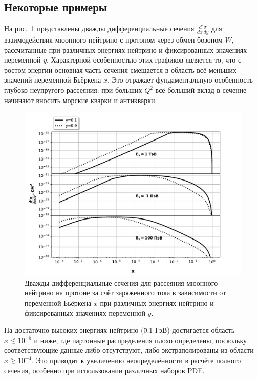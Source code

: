 \subsection{Некоторые примеры}

На рис.~\ref{fig:xsec_2d} представлены дважды дифференциальные сечения $\frac{d^2\sigma}{dx\,dy}$ для взаимодействия мюонного нейтрино с протоном через обмен бозоном $W$, рассчитанные при различных энергиях нейтрино и фиксированных значениях переменной $y$. Характерной особенностью этих графиков является то, что с ростом энергии основная часть сечения смещается в область всё меньших значений переменной Бьёркена $x$. Это отражает фундаментальную особенность глубоко-неупругого рассеяния: при больших $Q^2$ всё больший вклад в сечение начинают вносить морские кварки и антикварки.

\begin{figure}[!h]
\centering
\includegraphics[width=\linewidth]{images/NuProp/xs_vs_xCT18ZNNLO_cc_12_proton.pdf}
\caption{Дважды дифференциальные сечения для рассеяния мюонного нейтрино на протоне за счёт заряженного тока в зависимости от переменной Бьёркена $x$ при различных энергиях нейтрино и фиксированных значениях переменной $y$.}
\label{fig:xsec_2d}
\end{figure}

На достаточно высоких энергиях нейтрино (\~ 0.1 ГэВ) достигается область $x \lesssim 10^{-5}$ и ниже, где партонные распределения плохо определены, поскольку соответствующие данные либо отсутствуют, либо экстраполированы из области $x \gtrsim 10^{-4}$. Это приводит к увеличению неопределённости в расчёте полного сечения, особенно при использовании различных наборов PDF.

